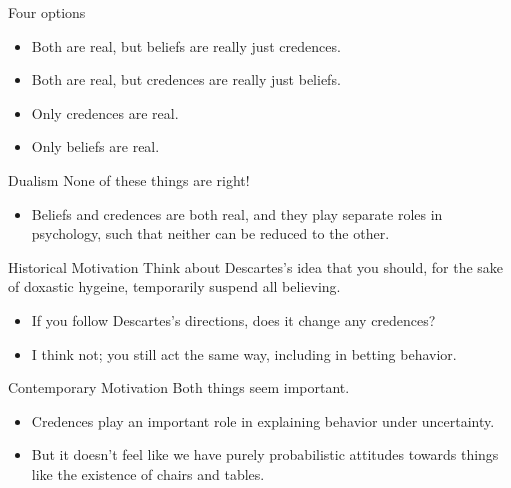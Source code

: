 \documentclass[
  17pt,
  letterpaper,
  ignorenonframetext,
  aspectratio=169,
]{beamer}
\providecommand{\tightlist}{%
  \setlength{\itemsep}{0pt}\setlength{\parskip}{0pt}}\usepackage{longtable,booktabs,array}
\begin{document}
\begin{frame}{Four options}
\protect\hypertarget{four-options}{}
\begin{itemize}[<+->]
\tightlist
\item
  Both are real, but beliefs are really just credences.
\item
  Both are real, but credences are really just beliefs.
\item
  Only credences are real.
\item
  Only beliefs are real.
\end{itemize}
\end{frame}

\begin{frame}{Dualism}
\protect\hypertarget{dualism}{}
None of these things are right!

\begin{itemize}[<+->]
\tightlist
\item
  Beliefs and credences are both real, and they play separate roles in
  psychology, such that neither can be reduced to the other.
\end{itemize}
\end{frame}

\begin{frame}{Historical Motivation}
\protect\hypertarget{historical-motivation}{}
Think about Descartes's idea that you should, for the sake of doxastic
hygeine, temporarily suspend all believing.

\begin{itemize}[<+->]
\tightlist
\item
  If you follow Descartes's directions, does it change any credences?
\item
  I think not; you still act the same way, including in betting
  behavior.
\end{itemize}
\end{frame}

\begin{frame}{Contemporary Motivation}
\protect\hypertarget{contemporary-motivation}{}
Both things seem important.

\begin{itemize}[<+->]
\tightlist
\item
  Credences play an important role in explaining behavior under
  uncertainty.
\item
  But it doesn't feel like we have purely probabilistic attitudes
  towards things like the existence of chairs and tables.
\end{itemize}
\end{frame}
\end{document}
